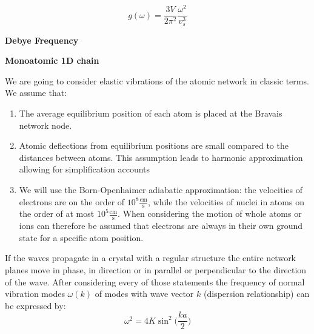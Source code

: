 \begin{equation}
    g(\omega) = \frac{3V}{2\pi^2} \frac{\omega^2}{v_s^3}
\end{equation}


\textbf{Debye Frequency}

\textbf{Monoatomic 1D chain}

We are going to consider elastic vibrations of the atomic network in classic
terms. We assume that:
\begin{enumerate}
\item The average equilibrium position of each atom is placed at the Bravais 
        network node.
\item Atomic deflections from equilibrium positions are small compared to the
        distances between atoms. This assumption leads to harmonic 
        approximation allowing for simplification accounts
\item We will use the Born-Openhaimer adiabatic approximation: the velocities
        of electrons are on the order of $10^8 \mathrm{\frac{cm}{s}}$, while 
        the velocities of nuclei in atoms on the order of at most $10^5 \mathrm
        {\frac{cm}{s}}$. When considering the motion of whole atoms or ions can 
        therefore be assumed that electrons are always in their own
        ground state for a specific atom position.
\end{enumerate}
If the waves propagate in a crystal with a regular structure the entire network planes move in phase, in direction or in parallel or perpendicular to the direction of the wave. After considering every of those statements the frequency of normal vibration modes
$\omega(k)$ of modes with wave vector $k$ (dispersion relationship) can be expressed by:
\begin{equation}
\omega^2 = 4K \sin^2\bigg(\frac{ka}{2}\bigg)  
\end{equation}

